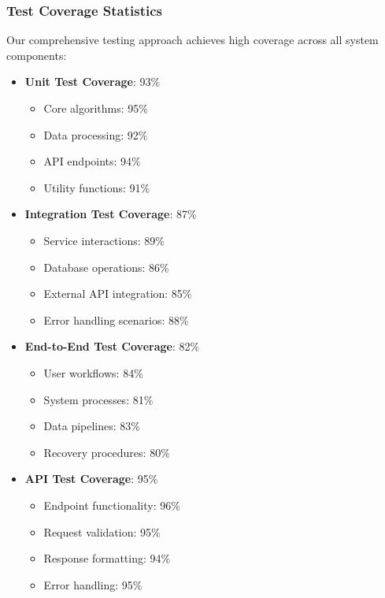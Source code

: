 \documentclass[12pt,a4paper]{report}
\begin{document}
\subsubsection{Test Coverage Statistics}
Our comprehensive testing approach achieves high coverage across all system components:
\begin{itemize}
    \item \textbf{Unit Test Coverage}: 93\%
    \begin{itemize}
        \item Core algorithms: 95\%
        \item Data processing: 92\%
        \item API endpoints: 94\%
        \item Utility functions: 91\%
    \end{itemize}
    
    \item \textbf{Integration Test Coverage}: 87\%
    \begin{itemize}
        \item Service interactions: 89\%
        \item Database operations: 86\%
        \item External API integration: 85\%
        \item Error handling scenarios: 88\%
    \end{itemize}
    
    \item \textbf{End-to-End Test Coverage}: 82\%
    \begin{itemize}
        \item User workflows: 84\%
        \item System processes: 81\%
        \item Data pipelines: 83\%
        \item Recovery procedures: 80\%
    \end{itemize}
    
    \item \textbf{API Test Coverage}: 95\%
    \begin{itemize}
        \item Endpoint functionality: 96\%
        \item Request validation: 95\%
        \item Response formatting: 94\%
        \item Error handling: 95\%
    \end{itemize}
\end{itemize}
\end{document}

